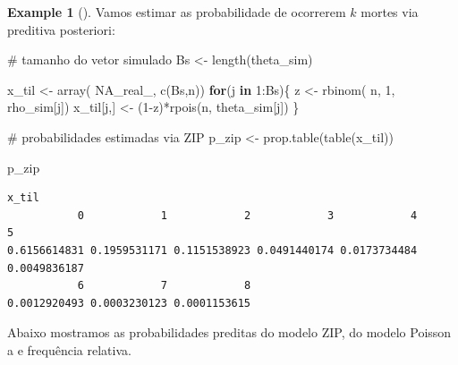 \documentclass[
  letterpaper,
  DIV=11,
  numbers=noendperiod]{scrreprt}
\newenvironment{Shaded}{\begin{snugshade}}{\end{snugshade}}
\newcommand{\CommentTok}[1]{\textcolor[rgb]{0.37,0.37,0.37}{#1}}
\newcommand{\ConstantTok}[1]{\textcolor[rgb]{0.56,0.35,0.01}{#1}}
\newcommand{\ControlFlowTok}[1]{\textcolor[rgb]{0.00,0.23,0.31}{\textbf{#1}}}
\newcommand{\DecValTok}[1]{\textcolor[rgb]{0.68,0.00,0.00}{#1}}
\newcommand{\FunctionTok}[1]{\textcolor[rgb]{0.28,0.35,0.67}{#1}}
\newcommand{\NormalTok}[1]{\textcolor[rgb]{0.00,0.23,0.31}{#1}}
\newcommand{\OtherTok}[1]{\textcolor[rgb]{0.00,0.23,0.31}{#1}}
\newcommand{\SpecialCharTok}[1]{\textcolor[rgb]{0.37,0.37,0.37}{#1}}
\theoremstyle{definition}
\theoremstyle{plain}
\theoremstyle{definition}
\newtheorem{example}{Example}[chapter]
\theoremstyle{remark}
\begin{document}
\begin{example}[]
Vamos estimar as probabilidade de ocorrerem \(k\) mortes via preditiva
posteriori:

\begin{Shaded}
\begin{Highlighting}[]
\CommentTok{\# tamanho do vetor simulado}
\NormalTok{Bs }\OtherTok{\textless{}{-}} \FunctionTok{length}\NormalTok{(theta\_sim)}

\NormalTok{x\_til }\OtherTok{\textless{}{-}} \FunctionTok{array}\NormalTok{( }\ConstantTok{NA\_real\_}\NormalTok{, }\FunctionTok{c}\NormalTok{(Bs,n))}
\ControlFlowTok{for}\NormalTok{(j }\ControlFlowTok{in} \DecValTok{1}\SpecialCharTok{:}\NormalTok{Bs)\{}
\NormalTok{  z }\OtherTok{\textless{}{-}} \FunctionTok{rbinom}\NormalTok{( n, }\DecValTok{1}\NormalTok{, rho\_sim[j])}
\NormalTok{  x\_til[j,] }\OtherTok{\textless{}{-}}\NormalTok{ (}\DecValTok{1}\SpecialCharTok{{-}}\NormalTok{z)}\SpecialCharTok{*}\FunctionTok{rpois}\NormalTok{(n, theta\_sim[j])}
\NormalTok{\}}

\CommentTok{\# probabilidades estimadas via ZIP}
\NormalTok{p\_zip }\OtherTok{\textless{}{-}} \FunctionTok{prop.table}\NormalTok{(}\FunctionTok{table}\NormalTok{(x\_til))}

\NormalTok{p\_zip}
\end{Highlighting}
\end{Shaded}

\begin{verbatim}
x_til
           0            1            2            3            4            5 
0.6156614831 0.1959531171 0.1151538923 0.0491440174 0.0173734484 0.0049836187 
           6            7            8 
0.0012920493 0.0003230123 0.0001153615 
\end{verbatim}

Abaixo mostramos as probabilidades preditas do modelo ZIP, do modelo
Poisson a e frequência relativa.


\end{example}
\end{document}
